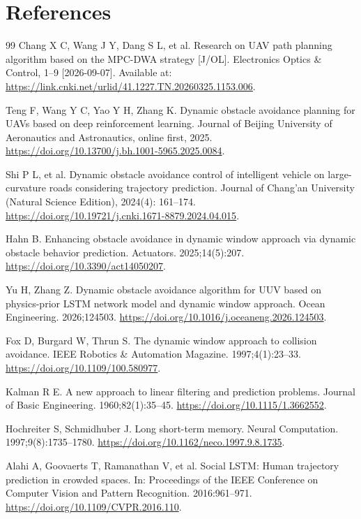 \documentclass[10pt,a4paper]{article}
\begin{document}
\section*{References}
\begin{thebibliography}{99}
 Chang X C, Wang J Y, Dang S L, et al. Research on UAV path planning algorithm based on the MPC-DWA strategy [J/OL]. Electronics Optics \& Control, 1–9 [2026-09-07]. Available at: \url{https://link.cnki.net/urlid/41.1227.TN.20260325.1153.006}.

 Teng F, Wang Y C, Yao Y H, Zhang K. Dynamic obstacle avoidance planning for UAVs based on deep reinforcement learning. Journal of Beijing University of Aeronautics and Astronautics, online first, 2025. \url{https://doi.org/10.13700/j.bh.1001-5965.2025.0084}.

 Shi P L, et al. Dynamic obstacle avoidance control of intelligent vehicle on large-curvature roads considering trajectory prediction. Journal of Chang'an University (Natural Science Edition), 2024(4): 161–174. \url{https://doi.org/10.19721/j.cnki.1671-8879.2024.04.015}.

 Hahn B. Enhancing obstacle avoidance in dynamic window approach via dynamic obstacle behavior prediction. Actuators. 2025;14(5):207. \url{https://doi.org/10.3390/act14050207}.

 Yu H, Zhang Z. Dynamic obstacle avoidance algorithm for UUV based on physics-prior LSTM network model and dynamic window approach. Ocean Engineering. 2026;124503. \url{https://doi.org/10.1016/j.oceaneng.2026.124503}.

 Fox D, Burgard W, Thrun S. The dynamic window approach to collision avoidance. IEEE Robotics \& Automation Magazine. 1997;4(1):23–33. \url{https://doi.org/10.1109/100.580977}.

 Kalman R E. A new approach to linear filtering and prediction problems. Journal of Basic Engineering. 1960;82(1):35–45. \url{https://doi.org/10.1115/1.3662552}.

 Hochreiter S, Schmidhuber J. Long short-term memory. Neural Computation. 1997;9(8):1735–1780. \url{https://doi.org/10.1162/neco.1997.9.8.1735}.

 Alahi A, Goovaerts T, Ramanathan V, et al. Social LSTM: Human trajectory prediction in crowded spaces. In: Proceedings of the IEEE Conference on Computer Vision and Pattern Recognition. 2016:961–971. \url{https://doi.org/10.1109/CVPR.2016.110}.


\end{thebibliography}
\end{document}
